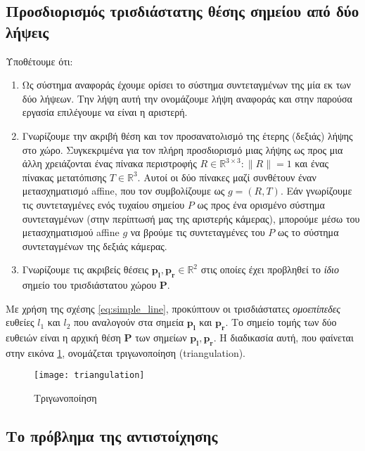 \subsection{Προσδιορισμός τρισδιάστατης θέσης σημείου από δύο λήψεις}

Υποθέτουμε ότι:

\begin{enumerate}
	\item Ως σύστημα αναφοράς έχουμε ορίσει το σύστημα συντεταγμένων της μία εκ των δύο λήψεων. Την λήψη αυτή την ονομάζουμε λήψη αναφοράς και στην παρούσα εργασία επιλέγουμε να είναι η αριστερή.
	\item Γνωρίζουμε την ακριβή θέση και τον προσανατολισμό της έτερης (δεξιάς) λήψης στο χώρο. Συγκεκριμένα για τον πλήρη προσδιορισμό μιας λήψης ως προς μια άλλη χρειάζονται ένας πίνακα περιστροφής $R \in \mathbb{R}^{3\times 3} : \parallel R\parallel = 1$ και ένας πίνακας μετατόπισης $T \in  \mathbb{R}^3$. Αυτοί οι δύο πίνακες μαζί συνθέτουν έναν μετασχηματισμό \e affine, \g που τον συμβολίζουμε ως $g = (R,T)$. Εάν γνωρίζουμε τις συντεταγμένες ενός τυχαίου σημείου $P$ ως προς ένα ορισμένο σύστημα συντεταγμένων (στην περίπτωσή μας της αριστερής κάμερας), μπορούμε μέσω του μετασχηματισμού \e affine \g $g$ να βρούμε τις συντεταγμένες του $P$ ως το σύστημα συντεταγμένων της δεξιάς κάμερας. 
	\item Γνωρίζουμε τις ακριβείς θέσεις $ \mathbf{p_l}, \mathbf{p_r} \in \mathbb{R}^2$ στις οποίες έχει προβληθεί το \emph{ίδιο} σημείο του τρισδιάστατου χώρου $\mathbf{P}$.
\end{enumerate}

Με χρήση της σχέσης \ref{eq:simple_line}, προκύπτουν οι τρισδιάστατες \emph{ομοεπίπεδες} ευθείες $l_1$ και $l_2$ που αναλογούν στα σημεία $\mathbf{p_l}$ και $\mathbf{p_r}$. Το σημείο τομής των δύο ευθειών είναι η αρχική θέση $\mathbf{P}$ των σημείων $\mathbf{p_l}, \mathbf{p_r}$. Η διαδικασία αυτή, που φαίνεται στην εικόνα \ref{fig:triangulation}, ονομάζεται τριγωνοποίηση \e (triangulation). \g

\begin{figure}
	\centering
	\texttt{[image: triangulation]}
	\caption{Τριγωνοποίηση}
	\label{fig:triangulation}
\end{figure}

\subsection{Το πρόβλημα της αντιστοίχησης}

